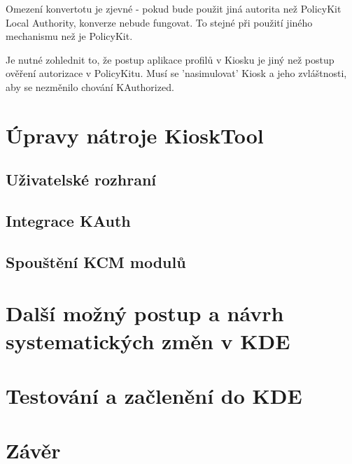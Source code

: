 Omezení konvertotu je zjevné - pokud bude použit jiná autorita než PolicyKit
Local Authority, konverze nebude fungovat. To stejné při použití jiného
mechanismu než je PolicyKit.

Je nutné zohlednit to, že postup aplikace profilů v Kiosku je jiný než postup
ověření autorizace v PolicyKitu. Musí se 'nasimulovat' Kiosk a jeho zvláštnosti,
aby se nezměnilo chování KAuthorized.



\chapter{Úpravy nátroje KioskTool}
\section{Uživatelské rozhraní}
\section{Integrace KAuth}
\section{Spouštění KCM modulů}
\chapter{Další možný postup a návrh systematických změn v KDE}
\chapter{Testování a začlenění do KDE}
\chapter{Závěr}
\cite{fitWeb}
